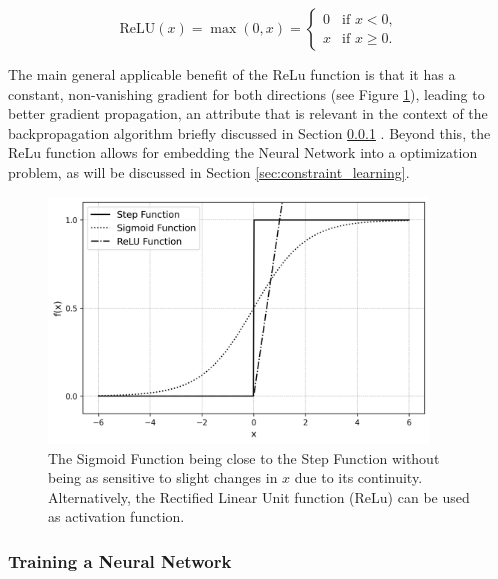 \[
\text{ReLU}(x) = \max(0, x) = 
\begin{cases}
	0 & \text{if } x < 0, \\
	x & \text{if } x \geq 0.
\end{cases}
\]
 
 The main general applicable benefit of the ReLu function is that it has a constant, non-vanishing gradient for both directions (see Figure \ref{fig:activation_functions}), leading to better gradient propagation, an attribute that is relevant in the context of the backpropagation algorithm briefly discussed in Section \ref{subsubsec:training_nn} \cite{preprintReLuGlorot, nielsen2015neuralChap1}. 
 Beyond this, the ReLu function allows for embedding the Neural Network into a optimization problem, as will be discussed in Section \ref{sec:constraint_learning}.

\begin{figure}[h] 
	\centering
	\includegraphics[width=0.9\textwidth]{../figures/modelling/activation_functions.png} %
	\caption{The Sigmoid Function being close to the Step Function without being as sensitive to slight changes in $x$ due to its continuity. Alternatively, the Rectified Linear Unit function (ReLu) can be used as activation function. }
	\label{fig:activation_functions}
\end{figure}

\subsubsection{Training a Neural Network} \label{subsubsec:training_nn}

